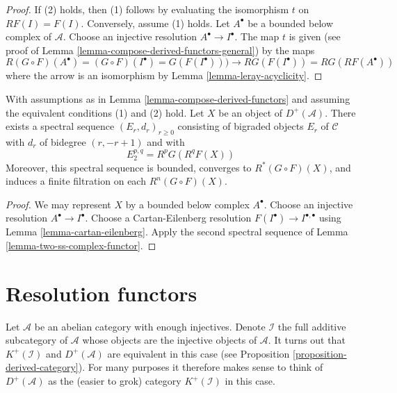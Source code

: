 \begin{proof}
If (2) holds, then (1) follows by evaluating the isomorphism
$t$ on $RF(I) = F(I)$. Conversely, assume (1) holds.
Let $A^\bullet$ be a bounded below complex of $\mathcal{A}$.
Choose an injective resolution $A^\bullet \to I^\bullet$.
The map $t$ is given (see proof of
Lemma \ref{lemma-compose-derived-functors-general})
by the maps
$$
R(G \circ F)(A^\bullet) =
(G \circ F)(I^\bullet) =
G(F(I^\bullet))) \to
RG(F(I^\bullet)) =
RG(RF(A^\bullet))
$$
where the arrow is an isomorphism by
Lemma \ref{lemma-leray-acyclicity}.
\end{proof}

\begin{lemma}
\label{lemma-grothendieck-spectral-sequence}
With assumptions as in Lemma \ref{lemma-compose-derived-functors}
and assuming the equivalent conditions (1) and (2) hold.
Let $X$ be an object of $D^{+}(\mathcal{A})$.
There exists a spectral sequence $(E_r, d_r)_{r \geq 0}$
consisting of bigraded objects $E_r$ of $\mathcal{C}$ with
$d_r$ of bidegree $(r, - r + 1)$ and with
$$
E_2^{p, q} = R^pG(R^qF(X))
$$
Moreover, this spectral sequence is bounded, converges to
$R^*(G \circ F)(X)$, and induces a finite filtration
on each $R^n(G \circ F)(X)$.
\end{lemma}

\begin{proof}
We may represent $X$ by a bounded below complex $A^\bullet$.
Choose an injective resolution $A^\bullet \to I^\bullet$.
Choose a Cartan-Eilenberg resolution
$F(I^\bullet) \to I^{\bullet, \bullet}$ using
Lemma \ref{lemma-cartan-eilenberg}.
Apply the second spectral sequence of
Lemma \ref{lemma-two-ss-complex-functor}.
\end{proof}






\section{Resolution functors}
\label{section-derived-category}

\noindent
Let $\mathcal{A}$ be an abelian category with enough injectives.
Denote $\mathcal{I}$ the full additive subcategory of $\mathcal{A}$ whose
objects are the injective objects of $\mathcal{A}$.
It turns out that $K^{+}(\mathcal{I})$ and $D^{+}(\mathcal{A})$
are equivalent in this case (see
Proposition \ref{proposition-derived-category}).
For many purposes it therefore makes sense to think of
$D^{+}(\mathcal{A})$ as the (easier to grok) category $K^{+}(\mathcal{I})$
in this case.

